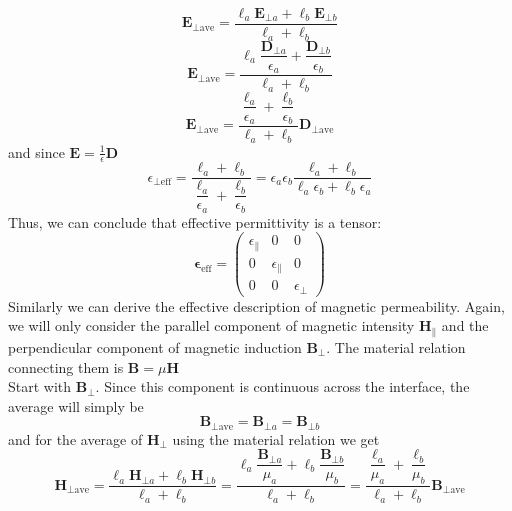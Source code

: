 \documentclass[a4paper]{scrartcl}
\begin{document}
\begin{equation}
      \mathbf{E}_{\bot \textrm{ave} } = \frac{\ell_a \mathbf{E}_{\bot a } + \ell_b
      \mathbf{E}_{\bot b }}{\ell_a + \ell_b }
\end{equation}
\begin{equation}
      \mathbf{E}_{\bot \textrm{ave} } = \dfrac{\ell_a \dfrac{\mathbf{D}_{\bot a }}{\epsilon_a } + \dfrac{\mathbf{D}_{\bot
      b }}{\epsilon_b }}{\ell_a + \ell_b }
\end{equation}
\begin{equation}
      \mathbf{E}_{\bot \textrm{ave} } = \dfrac{\dfrac{\ell_a }{\epsilon_a } + \dfrac {\ell_b
      }{\epsilon_b }}{ \ell_a + \ell_b }
      \mathbf{D}_{\bot \textrm{ave}}
\end{equation}
and since $\mathbf{E} = \frac{1}{\epsilon} \mathbf{D}$
\begin{equation}
      \epsilon_{\bot \textrm{eff} } = \dfrac{\ell_a + \ell_b }{\dfrac{\ell_a
      }{\epsilon_a } + \dfrac{\ell_b }{\epsilon_b }} =
      \epsilon_a \epsilon_b \dfrac{\ell_a + \ell_b }{\ell_a
      \epsilon_b + \ell_b \epsilon_a }
\end{equation}
Thus, we can conclude that effective permittivity is a tensor:
\begin{equation}
      \mathbf{\epsilon}_{\textrm{eff} } = \begin{pmatrix} \epsilon_{\parallel} & 0 & 0 \\ 0 & \epsilon_\parallel & 0 \\ 0 & 0 & \epsilon_\bot
      \end{pmatrix}
\end{equation}
\newpage
Similarly we can derive the effective description of magnetic permeability. Again, we will only consider the parallel
component of magnetic intensity $\mathbf{H}_\parallel$ and the perpendicular component of magnetic induction
$\mathbf{B}_\bot$. The material relation connecting them is $\mathbf{B} = \mu \mathbf{H}$ 
\\
Start with $\mathbf{B}_\bot$. Since this component is continuous across the interface, the average will simply be
\begin{equation}
      \mathbf{B}_{\bot \textrm{ave} } = \mathbf{B}_{\bot a } = \mathbf{B}_{\bot b }
\end{equation}
and for the average of $\mathbf{H}_{\bot}$ using the material relation we get
\begin{equation}
      \mathbf{H}_{\bot \textrm{ave} } = \dfrac{\ell_a \mathbf{H}_{\bot a } + \ell_b
            \mathbf{H}_{\bot b }}{\ell_a + \ell_b } = \dfrac{\ell_a
\dfrac{\mathbf{B}_{\bot a}}{\mu_a} + \ell_b \dfrac{\mathbf{B}_{\bot b}}{\mu_b}}{\ell_a + \ell_b} =
\dfrac{\dfrac{\ell_a}{\mu_a} + \dfrac{\ell_b}{\mu_b}}{\ell_a + \ell_b} \mathbf{B}_{\bot \textrm{ave} }
\end{equation}
\end{document}
